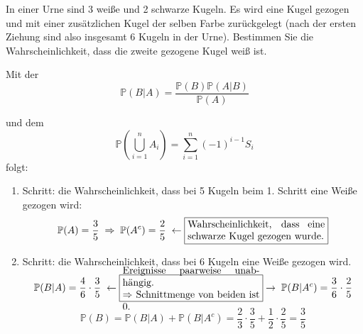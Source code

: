 \begin{uebsp}
\begin{Exercise}[label=ex:1.6]
In einer Urne sind 3 weiße und 2 schwarze Kugeln. Es wird eine Kugel gezogen und mit einer zusätzlichen Kugel der selben Farbe zurückgelegt (nach der ersten Ziehung sind also insgesamt 6 Kugeln in der Urne). Bestimmen Sie die Wahrscheinlichkeit, dass die zweite gezogene Kugel weiß ist.
\end{Exercise}
\begin{Answer}
    \begin{uebsp_theory}
        Mit der 
        \[\mathbb P(B|A)=\frac{\mathbb P(B)\mathbb P(A|B)}{\mathbb P(A)}\]
    \end{uebsp_theory}
    \begin{uebsp_theory}
        und dem  
        \[\mathbb P(\bigcup_{i=1}^n A_i)=\sum_{i=1}^n(-1)^{i-1}S_i\]
         folgt:
    \end{uebsp_theory}
\begin{enumerate}[1.]
    \item Schritt: die Wahrscheinlichkeit, dass bei 5 Kugeln beim 1. Schritt eine Weiße gezogen wird:
        \[\mathbb{P}(A)=\frac{3}{5}\;\Rightarrow\;\mathbb{P}(A^c)=\frac{2}{5}\;\leftarrow\fbox{\parbox[c][2em][c]{0.4\textwidth}{Wahrscheinlichkeit, dass eine schwarze Kugel gezogen wurde.}}\]
    \item Schritt: die Wahrscheinlichkeit, dass bei 6 Kugeln eine Weiße gezogen wird.
        \[\mathbb{P}(B|A)=\frac{4}{6}\cdot \frac{3}{5}\;\leftarrow\fbox{\parbox[c][2em][c]{0.4\textwidth}{Ereignisse paarweise unabhängig. \\$\Rightarrow$ Schnittmenge von beiden ist 0.}}\rightarrow\;\mathbb{P}(B|A^c)=\frac{3}{6}\cdot \frac{2}{5}\]
    \[\mathbb{P}(B)=\mathbb{P}(B|A)+\mathbb{P}(B|A^c)=\frac{2}{3}\cdot\frac{3}{5}+\frac{1}{2}\cdot \frac{2}{5}=\frac{3}{5}\]
        
\end{enumerate}
\end{Answer}
\end{uebsp}
